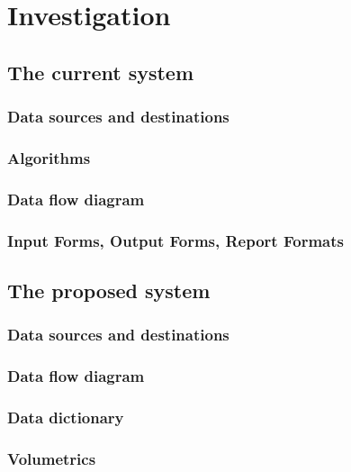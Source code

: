 \section{Investigation}

\subsection{The current system}

\subsubsection{Data sources and destinations}

\subsubsection{Algorithms}

\subsubsection{Data flow diagram}

\subsubsection{Input Forms, Output Forms, Report Formats}

\subsection{The proposed system}

\subsubsection{Data sources and destinations}

\subsubsection{Data flow diagram}

\subsubsection{Data dictionary}

\subsubsection{Volumetrics}

